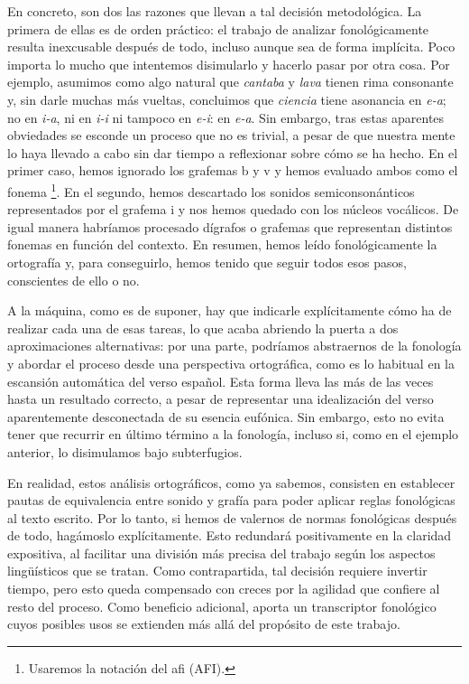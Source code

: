  En concreto, son dos las razones que llevan a tal decisión metodológica. La primera de ellas es de orden práctico: el trabajo de analizar fonológicamente resulta inexcusable después de todo, incluso aunque sea de forma implícita. Poco importa lo mucho que intentemos disimularlo y hacerlo pasar por otra cosa. Por ejemplo, asumimos como algo natural que \textit{cantaba} y \textit{lava} tienen rima consonante y, sin darle muchas más vueltas, concluimos que  \textit{ciencia} tiene asonancia en \textit{e-a}; no en \textit{i-a}, ni en \textit{i-i} ni tampoco en \textit{e-i}: en \textit{e-a}. Sin embargo, tras estas aparentes obviedades se esconde un proceso que no es trivial, a pesar de que nuestra mente lo haya llevado a cabo sin dar tiempo a reflexionar sobre cómo se ha hecho. En el primer caso, hemos ignorado los grafemas  \textlangle{}b\textrangle{} y \textlangle{}v\textrangle{} y hemos evaluado ambos como el fonema \footnote{Usaremos la notación del \acl{afi} (AFI).}. En el segundo, hemos descartado los sonidos semiconsonánticos representados por el grafema \textlangle{}i\textrangle{} y nos hemos quedado con los núcleos vocálicos. De igual manera habríamos procesado dígrafos o grafemas que representan distintos fonemas en función del contexto. En resumen, hemos leído fonológicamente la ortografía y, para conseguirlo, hemos tenido que seguir todos esos pasos, conscientes de ello o no.

A la máquina, como es de suponer, hay que indicarle explícitamente cómo ha de realizar cada una de esas tareas, lo que acaba abriendo la puerta a dos aproximaciones alternativas: por una parte, podríamos abstraernos de la fonología y abordar el proceso desde una perspectiva ortográfica, como es lo habitual en la escansión automática del verso español. Esta forma lleva las más de las veces hasta un resultado correcto, a pesar de representar una idealización del verso aparentemente desconectada de su esencia eufónica. Sin embargo, esto no evita tener que recurrir en último término a la fonología, incluso si, como en el ejemplo anterior, lo disimulamos bajo subterfugios.

En realidad, estos análisis ortográficos, como ya sabemos, consisten en establecer pautas de equivalencia entre sonido y grafía para poder aplicar reglas fonológicas al texto escrito. Por lo tanto, si hemos de valernos de normas fonológicas después de todo, hagámoslo explícitamente. Esto redundará positivamente en la claridad expositiva, al facilitar una división más precisa del trabajo según los aspectos lingüísticos que se tratan. Como contrapartida, tal decisión requiere invertir tiempo, pero esto queda compensado con creces por la agilidad que confiere al resto del proceso. Como beneficio adicional, aporta un transcriptor fonológico cuyos posibles usos se extienden más allá del propósito de este trabajo.

